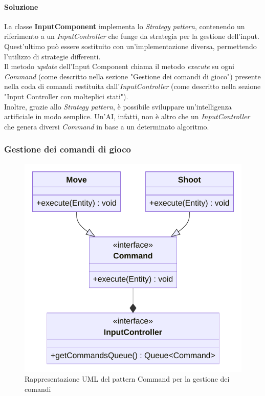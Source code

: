 \documentclass[a4paper,12pt]{report}
\begin{document}
\paragraph{Soluzione} La classe \textbf{InputComponent} implementa lo \textit{Strategy pattern}, contenendo un riferimento a un \textit{InputController} che funge da strategia per la gestione dell'input. Quest'ultimo può essere sostituito con un'implementazione diversa, permettendo l'utilizzo di strategie differenti.
\\
Il metodo \textit{update} dell’Input Component chiama il metodo \textit{execute} su ogni \textit{Command} (come descritto nella sezione "Gestione dei comandi di gioco") presente nella coda di comandi restituita dall'\textit{InputController} (come descritto nella sezione "Input Controller con molteplici stati").
\\
Inoltre, grazie allo \textit{Strategy pattern}, è possibile sviluppare un'intelligenza artificiale in modo semplice. Un'AI, infatti, non è altro che un \textit{InputController} che genera diversi \textit{Command} in base a un determinato algoritmo.
\\

\subsubsection{Gestione dei comandi di gioco}

\begin{figure}[H]
\centering{}
\includegraphics[scale=0.75]{img/CommandsUML}
\caption{Rappresentazione UML del pattern Command per la gestione dei comandi}
\label{img:command}
\end{figure}
\end{document}
